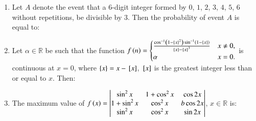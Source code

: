 \documentclass[journal,12pt,onecolumn]{IEEEtran}
\theoremstyle{remark}
\begin{document}
\begin{enumerate}
\item Let $A$ denote the event that a $6$-digit integer formed by $0$, $1$, $2$, $3$, $4$, $5$, $6$ without repetitions, be divisible by $3$. Then the probability of event $A$ is equal to:

\hfill{}
\begin{enumerate}
\end{enumerate}

\item Let $\alpha \in \mathbb{R}$ be such that the function $f\left(n\right) = \begin{cases} \frac{\cos^{-1}\left(1-\left\{x\right\}^2\right)\sin^{-1}\left(1-\left\{x\right\}\right)}{\left\{x\right\}-\left\{x\right\}^3} & x\neq 0, \\\alpha & x=0 .\end{cases}$ is continuous at $x=0$, where $\left\{x\right\}=x-{}\left[x\right]$, ${}\left[x\right]$ is the greatest integer less than or equal to $x$. Then:

\hfill{}
\begin{enumerate}
\end{enumerate}

\item The maximum value of $f\left(x\right) = \begin{vmatrix}\sin^{2}x &1+\cos^{2}x & \cos 2x\\1+\sin^{2}x & \cos^{2}x & b \cos 2x\\\sin^{2}x & \cos^{2}x & \sin 2x\end{vmatrix}$, $x \in \mathbb{R}$ is:

\hfill{}
\begin{enumerate}
\end{enumerate}


\end{enumerate}
\end{document}
